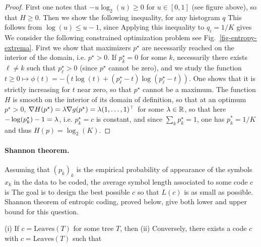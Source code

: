 \begin{proof}
	First one notes that $-u\log_2(u) \geq 0$ for $u \in [0,1]$ (see figure above), so that $H \geq 0$.
	Then we show the following inequality, for any histogram $q$ 
	This follows from $\log(u) \leq u-1$, since
	Applying this inequality to $q_i=1/K$ gives
	We consider the following constrained optimization problem
	see Fig.~\ref{fig-entropy-extrema}.
	First we show that maximizers $p^\star$ are necessarily reached on the interior of the domain, i.e. $p^\star>0$.
	If $p_k^\star=0$ for some $k$, necessarily there exists $\ell \neq k$ such that $p_\ell^\star>0$ (since $p^\star$ cannot be zero), and we study the function 
	$t \geq 0 \mapsto \phi(t) = - ( t \log(t) + (p_\ell^\star-t) \log(p_\ell^\star-t) )$. One shows that it is strictly increasing for $t$ near zero, so that $p^\star$ cannot be a maximum.	
	The function $H$ is smooth on the interior of its domain of definition, so that 
	at an optimum $p^\star>0$, $\nabla H(p^\star)=\lambda \nabla g(p^\star) = \lambda (1,\ldots,1)^\top$ for some $\lambda \in \mathbb{R}$, so that here $-\log(p_k^\star)-1 = \lambda$, i.e. $p_k^\star=c$ is constant, and since  $\sum_k p_k^\star=1$, one has $p_k^*=1/K$ and thus $H(p)=\log_2(K)$.
	\fi
\end{proof}


\paragraph{Shannon theorem.}

%
Assuming that $(p_k)_k$ is the empirical probability of appearance of the symbols $x_k$ in the data to be coded, the average symbol length associated to some code $c$ is 
The goal is to design the best possible $c$ so that $L(c)$ is as small as possible.
%
Shannon theorem of entropic coding, proved below, give both lower and upper bound for this question. 

\begin{thm}
	(i) If $c=\text{Leaves}(T)$ for some tree $T$, then 
	(ii) Conversely, there exists a code $c$ with $c=\text{Leaves}(T)$ such that 
\end{thm} 

